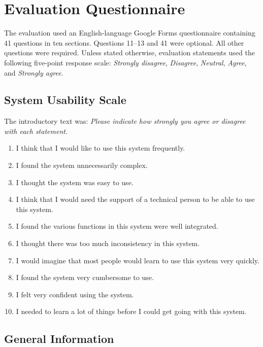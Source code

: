 \chapter{Evaluation Questionnaire}
\label{app:evaluation-questionnaire}

\begingroup
\setlength{\emergencystretch}{3em}
\small

The evaluation used an English-language Google Forms questionnaire containing 41 questions in ten sections. Questions 11--13 and 41 were optional. All other questions were required. Unless stated otherwise, evaluation statements used the following five-point response scale: \emph{Strongly disagree}, \emph{Disagree}, \emph{Neutral}, \emph{Agree}, and \emph{Strongly agree}.

\section{System Usability Scale}

The introductory text was: \emph{Please indicate how strongly you agree or disagree with each statement.}

\begin{enumerate}
  \item I think that I would like to use this system frequently.
  \item I found the system unnecessarily complex.
  \item I thought the system was easy to use.
  \item I think that I would need the support of a technical person to be able to use this system.
  \item I found the various functions in this system were well integrated.
  \item I thought there was too much inconsistency in this system.
  \item I would imagine that most people would learn to use this system very quickly.
  \item I found the system very cumbersome to use.
  \item I felt very confident using the system.
  \item I needed to learn a lot of things before I could get going with this system.
\end{enumerate}

\section{General Information}

